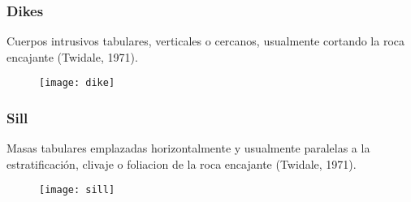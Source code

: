 \documentclass{beamer}
\begin{document}
\begin{frame}
\frametitle{Dikes}
\small{Cuerpos intrusivos tabulares, verticales o cercanos, usualmente cortando la roca encajante (Twidale, 1971).}
\begin{figure}
\begin{center}
\texttt{[image: dike]}
\end{center}
\end{figure}
\end{frame}
\begin{frame}
\frametitle{Sill}
\small{Masas tabulares emplazadas horizontalmente y usualmente paralelas a la estratificación, clivaje o foliacion de la roca encajante (Twidale, 1971).}
\begin{figure}
\begin{center}
\texttt{[image: sill]}
\end{center}
\end{figure}
\end{frame}
\end{document}
